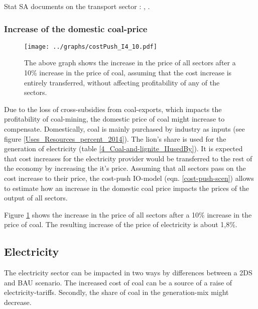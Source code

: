 \documentclass[12pt,english]{article}
\begin{document}

Stat SA documents on the transport sector : \citep{LandTransp2014}, \citep{P7000_2013}.

\subsubsection{Increase of the domestic coal-price}

\begin{figure}[!h]
	\hspace{-10pt}\texttt{[image: ../graphs/costPush\_I4\_10.pdf]}
	\caption{\label{costPush_I4_10} The above graph shows the increase in the price of all sectors after a 10\% increase in the price of coal, assuming that the cost increase is entirely transferred, without affecting profitability of any of the sectors.}
\end{figure}


Due to the loss of cross-subsidies from coal-exports, which impacts the profitability of coal-mining, the domestic price of coal might increase to compensate. Domestically, coal is mainly purchased by industry as inputs (see figure \ref{Uses_Resources_percent_2014}). The lion's share is used for the generation of electricity (table \ref{4_Coal-and-lignite_IIusedBy}). It is expected that cost increases for the electricity provider would be transferred to the rest of the economy by increasing the it's price. Assuming that all sectors pass on the cost increase to their price, the cost-push IO-model (eqn. \ref{cost-push-scen}) allows to estimate how an increase in the domestic coal price impacts the prices of the output of all sectors. 

Figure \ref{costPush_I4_10} shows the increase in the price of all sectors after a 10\% increase in the price of coal. The resulting increase of the price of electricity is about 1,8\%.


\subsection{Electricity}

The electricity sector can be impacted in two ways by differences between a 2DS and BAU scenario. The increased cost of coal can be a source of a raise of electricity-tariffs. Secondly, the share of coal in the generation-mix might decrease.
\end{document}
